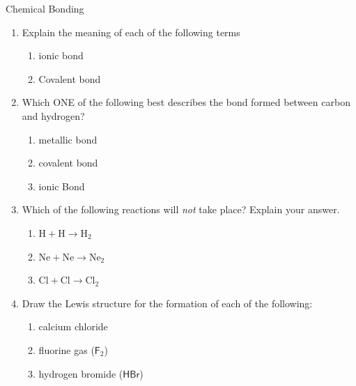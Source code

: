 \label{m38689*secfhsst!!!underscore!!!id1181}
            \begin{eocexercises}{Chemical Bonding}
            \nopagebreak
      \label{m38689*id147820}\begin{enumerate}[noitemsep, label=\textbf{\arabic*}. ] 
            \label{m38689*uid158}\item Explain the meaning of each of the following terms
\label{m38689*id147842}\begin{enumerate}[noitemsep, label=\textbf{\alph*}. ] 
            \label{m38689*uid159}\item ionic bond
\label{m38689*uid160}\item Covalent bond
\end{enumerate}
                \label{m38689*uid162}\item Which ONE of the following best describes the bond formed between carbon and hydrogen?
\label{m38689*id147923}\begin{enumerate}[noitemsep, label=\textbf{\alph*}. ] 
            \label{m38689*uid163}\item metallic bond
\label{m38689*uid164}\item covalent bond
\label{m38689*uid165}\item ionic Bond
\end{enumerate}
                \label{m38689*uid171}\item Which of the following reactions will \textsl{not} take place? Explain your answer.
\label{m38689*id148047}\begin{enumerate}[noitemsep, label=\textbf{\alph*}. ] 
            \label{m38689*uid172}\item $\mathrm{H}+\mathrm{H}\to {\mathrm{H}}_{2}$\label{m38689*uid173}\item $\mathrm{Ne}+\mathrm{Ne}\to {\mathrm{Ne}}_{2}$\label{m38689*uid174}\item $\mathrm{Cl}+\mathrm{Cl}\to {\mathrm{Cl}}_{2}$\end{enumerate}
                \label{m38689*uid175}\item Draw the Lewis structure for the formation of each of the following:
\label{m38689*id148172}\begin{enumerate}[noitemsep, label=\textbf{\alph*}. ] 
            \label{m38689*uid176}\item calcium chloride
\label{m38689*uid177}\item fluorine gas ($\mathsf{F}_2$)
\label{m38689*uid178}\item hydrogen bromide ($\mathsf{HBr}$)

\end{enumerate}
\end{enumerate}
\end{eocexercises}
